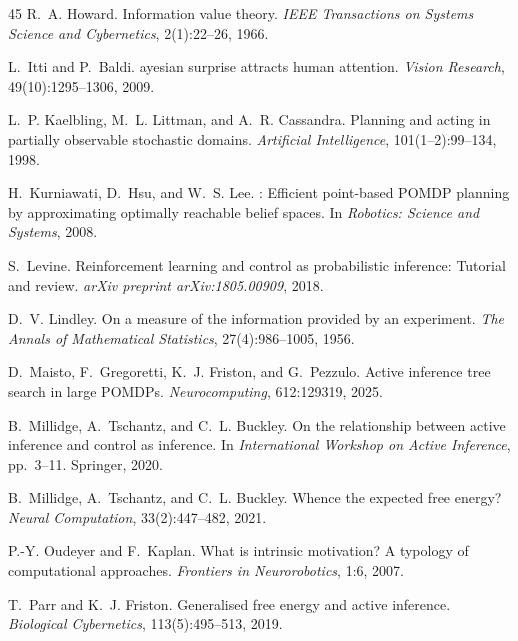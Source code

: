 \documentclass{article}
\begin{document}
{\begin{thebibliography}{45}
R.~A. Howard.
\newblock Information value theory.
\newblock \emph{IEEE Transactions on Systems Science and Cybernetics}, 2(1):22--26, 1966.

L.~Itti and P.~Baldi.
ayesian surprise attracts human attention.
\newblock \emph{Vision Research}, 49(10):1295--1306, 2009.

L.~P. Kaelbling, M.~L. Littman, and A.~R. Cassandra.
\newblock Planning and acting in partially observable stochastic domains.
\newblock \emph{Artificial Intelligence}, 101(1--2):99--134, 1998.

H.~Kurniawati, D.~Hsu, and W.~S. Lee.
: Efficient point-based {POMDP} planning by approximating optimally reachable belief spaces.
\newblock In \emph{Robotics: Science and Systems}, 2008.

S.~Levine.
\newblock Reinforcement learning and control as probabilistic inference: Tutorial and review.
\newblock \emph{arXiv preprint arXiv:1805.00909}, 2018.

D.~V. Lindley.
\newblock On a measure of the information provided by an experiment.
\newblock \emph{The Annals of Mathematical Statistics}, 27(4):986--1005, 1956.

D.~Maisto, F.~Gregoretti, K.~J. Friston, and G.~Pezzulo.
\newblock Active inference tree search in large {POMDP}s.
\newblock \emph{Neurocomputing}, 612:129319, 2025.

B.~Millidge, A.~Tschantz, and C.~L. Buckley.
\newblock On the relationship between active inference and control as inference.
\newblock In \emph{International Workshop on Active Inference}, pp.\ 3--11. Springer, 2020.

B.~Millidge, A.~Tschantz, and C.~L. Buckley.
\newblock Whence the expected free energy?
\newblock \emph{Neural Computation}, 33(2):447--482, 2021.

P.-Y. Oudeyer and F.~Kaplan.
\newblock What is intrinsic motivation? {A} typology of computational approaches.
\newblock \emph{Frontiers in Neurorobotics}, 1:6, 2007.

T.~Parr and K.~J. Friston.
\newblock Generalised free energy and active inference.
\newblock \emph{Biological Cybernetics}, 113(5):495--513, 2019.


\end{thebibliography}}
\end{document}
